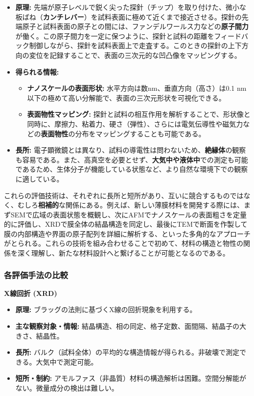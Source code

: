 \documentclass[11pt,a4paper]{ltjsarticle}
\begin{document}
\begin{itemize}
\item \textbf{原理:} 先端が原子レベルで鋭く尖った探針（チップ）を取り付けた、微小な板ばね（\textbf{カンチレバー}）を試料表面に極めて近くまで接近させる。探針の先端原子と試料表面の原子との間には、ファンデルワールス力などの\textbf{原子間力}が働く。この原子間力を一定に保つように、探針と試料の距離をフィードバック制御しながら、探針を試料表面上で走査する。このときの探針の上下方向の変位を記録することで、表面の三次元的な凹凸像をマッピングする。
\item \textbf{得られる情報:}
\begin{itemize}
\item \textbf{ナノスケールの表面形状:} 水平方向は数nm、垂直方向（高さ）は0.1 nm以下の極めて高い分解能で、表面の三次元形状を可視化できる。
\item \textbf{表面物性マッピング:} 探針と試料の相互作用を解析することで、形状像と同時に、摩擦力、粘着力、硬さ（弾性）、さらには電気伝導性や磁気力などの\textbf{表面物性}の分布をマッピングすることも可能である。
\end{itemize}
\item \textbf{長所:} 電子顕微鏡とは異なり、試料の導電性は問わないため、\textbf{絶縁体}の観察も容易である。また、高真空を必要とせず、\textbf{大気中や液体中}での測定も可能であるため、生体分子が機能している状態など、より自然な環境下での観察に適している。
\end{itemize}

これらの評価技術は、それぞれに長所と短所があり、互いに競合するものではなく、むしろ\textbf{相補的}な関係にある。例えば、新しい薄膜材料を開発する際には、まずSEMで広域の表面状態を概観し、次にAFMでナノスケールの表面粗さを定量的に評価し、XRDで膜全体の結晶構造を同定し、最後にTEMで断面を作製して膜の内部構造や界面の原子配列を詳細に解析する、といった多角的なアプローチがとられる。これらの技術を組み合わせることで初めて、材料の構造と物性の関係を深く理解し、新たな材料設計へと繋げることが可能となるのである。

\subsubsection*{各評価手法の比較}

\textbf{X線回折 (XRD)}
\begin{itemize}
    \item \textbf{原理:} ブラッグの法則に基づくX線の回折現象を利用する。
    \item \textbf{主な観察対象・情報:} 結晶構造、相の同定、格子定数、面間隔、結晶子の大きさ、結晶性。
    \item \textbf{長所:} バルク（試料全体）の平均的な構造情報が得られる。非破壊で測定できる。大気中で測定可能。
    \item \textbf{短所・制約:} アモルファス（非晶質）材料の構造解析は困難。空間分解能がない。微量成分の検出は難しい。
\end{itemize}
\end{document}
